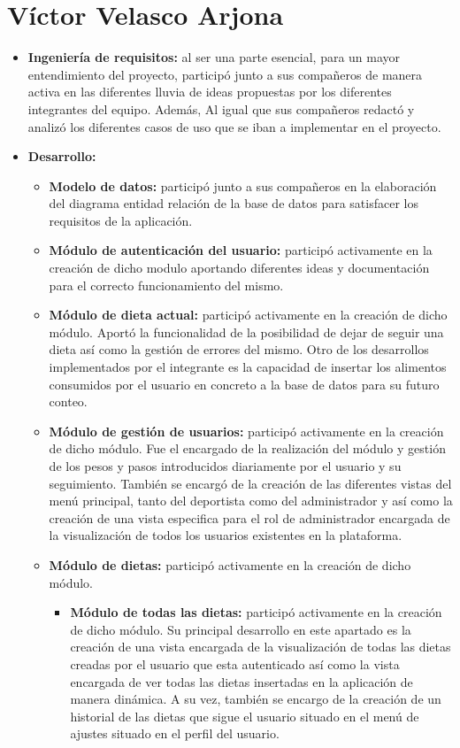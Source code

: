 \section{Víctor Velasco Arjona}
\begin{itemize}
    \item \textbf{Ingeniería de requisitos:} al ser una parte esencial, para un mayor entendimiento del proyecto, participó junto a sus compañeros de manera activa en las diferentes lluvia de ideas propuestas por los diferentes integrantes del equipo. Además, Al igual que sus compañeros redactó y analizó los diferentes casos de uso que se iban a implementar en el proyecto.
    \item \textbf{Desarrollo:}
        \begin{itemize}
            \item \textbf{Modelo de datos:} participó junto a sus compañeros en la elaboración del diagrama entidad relación de la base de datos para satisfacer los requisitos de la aplicación.
            \item \textbf{Módulo de autenticación del usuario:} participó activamente en la creación de dicho modulo aportando diferentes ideas y documentación para el correcto funcionamiento del mismo.
            \item \textbf{Módulo de dieta actual:} participó activamente en la creación de dicho módulo. Aportó la funcionalidad de la posibilidad de dejar de seguir una dieta así como la gestión de errores del mismo. Otro de los desarrollos implementados por el integrante es la capacidad de insertar los alimentos consumidos por el usuario en concreto a la base de datos para su futuro conteo.
            \item \textbf{Módulo de gestión de usuarios:} participó activamente en la creación de dicho módulo. Fue el encargado de la realización del módulo y gestión de los pesos y pasos introducidos diariamente por el usuario y su seguimiento. También se encargó de la creación de las diferentes vistas del menú principal, tanto del deportista como del administrador y así como la creación de una vista especifica para el rol de administrador encargada de la visualización de todos los usuarios existentes en la plataforma.
            \item \textbf{Módulo de dietas:} participó activamente en la creación de dicho módulo.
            \begin{itemize}
                \item \textbf{Módulo de todas las dietas:} participó activamente en la creación de dicho módulo. Su principal desarrollo en este apartado es la creación de una vista encargada de la visualización de todas las dietas creadas por el usuario que esta autenticado así como la vista encargada de ver todas las dietas insertadas en la aplicación de manera dinámica. A su vez, también se encargo de la creación de un historial de las dietas que sigue el usuario situado en el menú de ajustes situado en el perfil del usuario.

\end{itemize}
\end{itemize}
\end{itemize}
